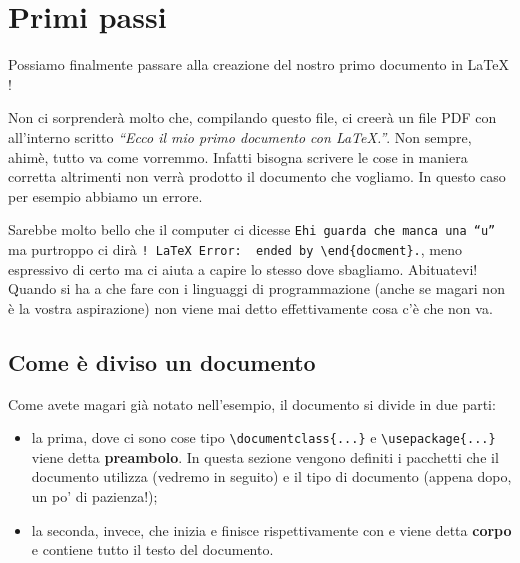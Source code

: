 \chapter{Primi passi}
Possiamo finalmente passare alla creazione del nostro primo documento in \LaTeX{}
!

Non ci sorprenderà molto che, compilando questo file, ci creerà un file PDF con 
all'interno scritto \textit{``Ecco il mio primo documento con \LaTeX{}.''}. Non 
sempre, ahimè, tutto va come vorremmo. Infatti bisogna scrivere le cose in 
maniera corretta altrimenti non verrà prodotto il documento che vogliamo. In 
questo caso per esempio abbiamo un errore.

Sarebbe molto bello che il computer ci dicesse \texttt{Ehi guarda che manca 
una ``u''} ma purtroppo ci dirà 
\verb|! LaTeX Error:  ended by \end{docment}.|, meno 
espressivo di certo ma ci aiuta a capire lo stesso dove sbagliamo. Abituatevi! 
Quando si ha a che fare con i linguaggi di programmazione (anche se magari non 
è la vostra aspirazione) non viene mai detto effettivamente cosa c'è che non 
va.

\section{Come è diviso un documento}
Come avete magari già notato nell'esempio, il documento si divide in due parti:
\begin{itemize}
    \item la prima, dove ci sono cose tipo \verb!\documentclass{...}! e 
    \verb!\usepackage{...}! viene detta \textbf{preambolo}. In questa sezione 
    vengono definiti i pacchetti che il documento utilizza (vedremo in 
    seguito) e il tipo di documento (appena dopo, un po' di pazienza!);
    \item la seconda, invece, che inizia e finisce rispettivamente con 
    \verb!! e \verb!! viene detta \textbf{corpo} 
    e contiene tutto il testo del documento.
\end{itemize}

